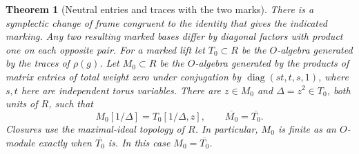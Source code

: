 \documentclass[a4paper,11pt]{article}
\newtheorem{theorem}[proposition]{Theorem}
\theoremstyle{definition}
\theoremstyle{remark}
\numberwithin{equation}{section}
\begin{document}
\begin{theorem}[Neutral entries and traces with the two marks]
\leavevmode\label{thm:twomarks557}
There is a symplectic change of frame congruent to the identity
that gives the indicated marking. Any two resulting marked
bases differ by diagonal factors with product one on each
opposite pair. For a marked lift let \(T_0\subset R\) be the
\(O\)-algebra generated by the traces of \(\rho(g)\). Let
\(M_0\subset R\) be the \(O\)-algebra generated by the products
of matrix entries of total weight zero under conjugation by
\(\operatorname{diag}(st,t,s,1)\), where \(s,t\) here are
independent torus variables. There are \(z\in M_0\) and
\(\Delta=z^2\in T_0\), both units of \(R\), such that
\[
       M_0[1/\Delta]=T_0[1/\Delta,z],\qquad
                      \overline{M_0}=\overline{T_0}.
\]
Closures use the maximal-ideal topology of \(R\). In particular,
\(M_0\) is finite as an \(O\)-module exactly when
\(\overline{T_0}\) is. In this case \(M_0=\overline{T_0}\).
\end{theorem}
\end{document}
